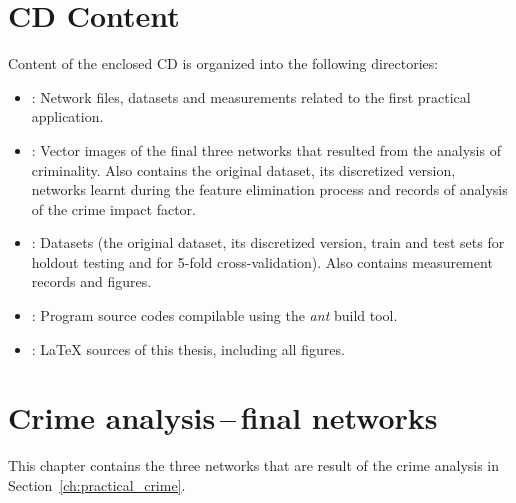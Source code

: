 \chapter{CD Content}\label{ch:appendix_cd_content}
Content of the enclosed CD is organized into the following directories:
\begin{itemize}
    \item {}: Network  files, datasets and measurements related to the first practical application.
    \item {}: Vector images of the final three networks that resulted from the analysis of criminality. Also contains the original dataset, its discretized version, networks learnt during the feature elimination process and records of analysis of the crime impact factor.
    \item {}: Datasets (the original dataset, its discretized version, train and test sets for holdout testing and for 5-fold cross-validation). Also contains measurement records and figures.
    \item {}: Program source codes compilable using the \emph{ant} build tool.
    \item {}:  {\LaTeX} sources of this thesis, including all figures.
\end{itemize} 





\chapter{Crime analysis\,--\,final networks}\label{ch:appendix_crime_net}
This chapter contains the three networks that are result of the crime analysis in Section~\ref{ch:practical_crime}.


